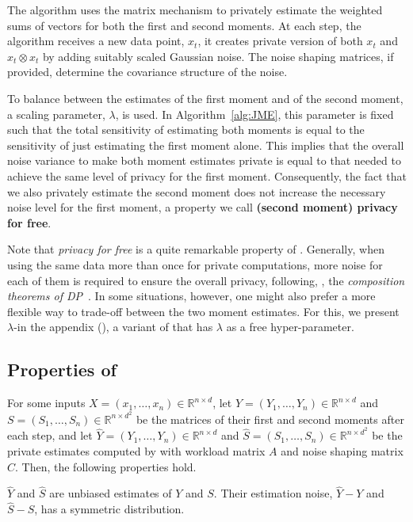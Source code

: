 The algorithm uses the matrix mechanism to privately estimate 
the weighted sums of vectors for both the first and second moments. 
%
At each step, the algorithm receives a new data point, $x_t$, it creates private version of both $x_t$ and $x_t \otimes x_t$ by 
adding suitably scaled Gaussian noise.
%
The noise shaping matrices, if provided, determine the covariance structure of the noise. 
%

To balance between the estimates of the first moment and 
of the second moment, a scaling parameter, $\lambda$, is
used. 
%
In Algorithm~\ref{alg:JME}, this parameter is fixed such that 
the total sensitivity of estimating both moments is equal to the sensitivity of just 
estimating the first moment alone. 
%
This implies that the overall noise variance to make both moment estimates private is equal to that needed to achieve the same level of privacy for the first moment. 
%
Consequently, the fact that we also privately estimate the 
second moment does not increase the necessary noise level 
for the first moment, a property we call \textbf{(second moment) privacy for free}. 

Note that \emph{privacy for free} is a quite remarkable property of \acronym. 
%
Generally, when using the same data more than once for private
computations, more noise for each of them is required to ensure 
the overall privacy, following, \eg, the \emph{composition 
theorems of DP}~\citep{kairouz15}. 
%
In some situations, however, one might also prefer a more flexible way to trade-off between the two moment estimates.
%
For this, we present $\lambda$-\acronym in the appendix 
(), a variant of \acronym that has $\lambda$ as a free hyper-parameter.


\subsection{Properties of \acronym}
%
For some inputs $X=(x_1,\dots,x_n)\in\mathbb{R}^{n\times d}$,
let $Y=(Y_1,\dots,Y_n)\in\mathbb{R}^{n\times d}$ and 
$S=(S_1,\dots,S_n)\in\mathbb{R}^{n\times d^2}$ be the 
matrices of their first and second moments after each step,
and let $\widehat Y=(Y_1,\dots,Y_n)\in\mathbb{R}^{n\times d}$ 
and $\widehat S=(S_1,\dots,S_n)\in\mathbb{R}^{n\times d^2}$ 
be the private estimates computed by 
with workload matrix $A$ and noise shaping matrix $C$. 
%
Then, the following properties hold.


\begin{theorem}\label{thm:jmenoise}
$\widehat Y$ and $\widehat S$ are unbiased estimates of $Y$ and $S$. 
%
Their estimation noise, $\widehat Y-Y$ and $\widehat S-S$, has 
a symmetric distribution.
\end{theorem}

